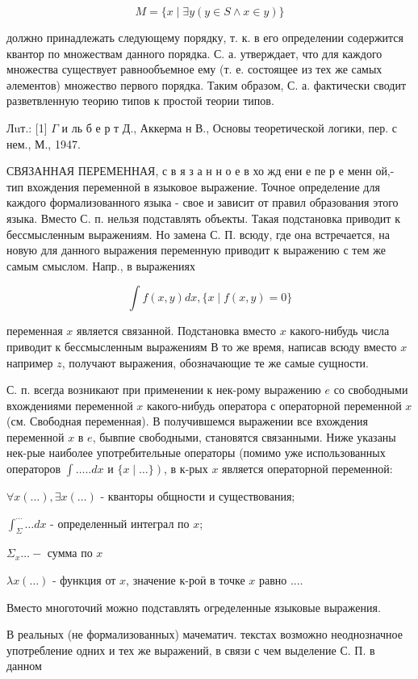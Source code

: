\documentclass[10pt]{article}
\begin{document}
\[

M=\{x \mid \exists y(y \in S \wedge x \in y)\}

\]



должно принадлежать следующему порядку, т. к. в его определении содержится квантор по множествам данного порядка. С. а. утверждает, что для каждого множества существует равнообъемное ему (т. е. состоящее из тех же самых әлементов) множество первого порядка. Таким образом, С. а. фактически сводит разветвленную теорию типов $к$ простой теории типов.



Лuт.: [1] $\Gamma$ и ль б е р т Д., Аккерма н В., Основы теоретической логики, пер. с нем., М., 1947.



СВЯЗАННАЯ ПЕРЕМЕННАЯ, с в я з а н н о е в хо жд ени е пе р е менн ой,- тип вхождения переменной в языковое выражение. Точное определение для каждого формализованного языка - свое и зависит от правил образования этого языка. Вместо С. п. нельзя подставлять объекты. Такая подстановка приводит к бессмысленным выражениям. Но замена С. П. всюду, где она встречается, на новую для данного выражения переменную приводит к выражению с тем же самым смыслом. Напр., в выражениях



\[

\int f(x, y) d x,\{x \mid f(x, y)=0\}

\]



переменная $x$ является связанной. Подстановка вместо $x$ какого-нибудь числа приводит к бессмысленным выражениям В то же время, написав всюду вместо $x$ например $z$, получают выражения, обозначающие те же самые сущности.



С. п. всегда возникают при применении к нек-рому выражению $e$ со свободными вхождениями переменной $x$ какого-нибудь оператора с операторной переменной $x$ (см. Свободная переменная). В получившемся выражении все вхождения переменной $x$ в $e$, бывпие свободными, становятся связанными. Ниже указаны нек-рые наиболее употребительные операторы (помимо уже использованных операторов $\int \ldots . . d x$ и $\left.\{x \mid \ldots\}\right)$, в к-рых $x$ является операторной переменной:



$\forall x(\ldots), \exists x(\ldots)$ - кванторы общности и существования;



$\int_{\Sigma}^{\cdots} \ldots d x$ - определенный интеграл по $x$;



$\Sigma_{x} \ldots-$ сумма по $x$



$\lambda x(\ldots)$ - функция от $x$, значение к-роӥ в точке $x$ равно ....



Вместо многоточий можно подставлять огределенные языковые выражения.



В реальных (не формализованных) мачематич. текстах возможно неоднозначное употребление одних и тех же выражений, в связи с чем выделение С. П. в данном
\end{document}
